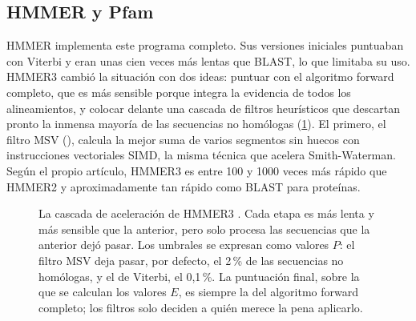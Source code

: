 \subsection{HMMER y Pfam}

HMMER implementa este programa completo. Sus versiones iniciales puntuaban con Viterbi y eran unas cien veces más lentas que BLAST, lo que limitaba su uso. HMMER3 \parencite{c04-eddy2011} cambió la situación con dos ideas: puntuar con el algoritmo forward completo, que es más sensible porque integra la evidencia de todos los alineamientos, y colocar delante una cascada de filtros heurísticos que descartan pronto la inmensa mayoría de las secuencias no homólogas (\cref{fig:04-hmmer}). El primero, el filtro MSV (), calcula la mejor suma de varios segmentos sin huecos con instrucciones vectoriales SIMD, la misma técnica que acelera Smith-Waterman. Según el propio artículo, HMMER3 es entre 100 y \num{1000} veces más rápido que HMMER2 y aproximadamente tan rápido como BLAST para proteínas.

\begin{figure}[tbp]
\centering
{}
\caption[El embudo de filtros de HMMER3]{La cascada de aceleración de HMMER3 \parencite{c04-eddy2011}. Cada etapa es más lenta y más sensible que la anterior, pero solo procesa las secuencias que la anterior dejó pasar. Los umbrales se expresan como valores $P$: el filtro MSV deja pasar, por defecto, el 2\,\% de las secuencias no homólogas, y el de Viterbi, el 0,1\,\%. La puntuación final, sobre la que se calculan los valores $E$, es siempre la del algoritmo forward completo; los filtros solo deciden a quién merece la pena aplicarlo.}
\label{fig:04-hmmer}
\end{figure}

